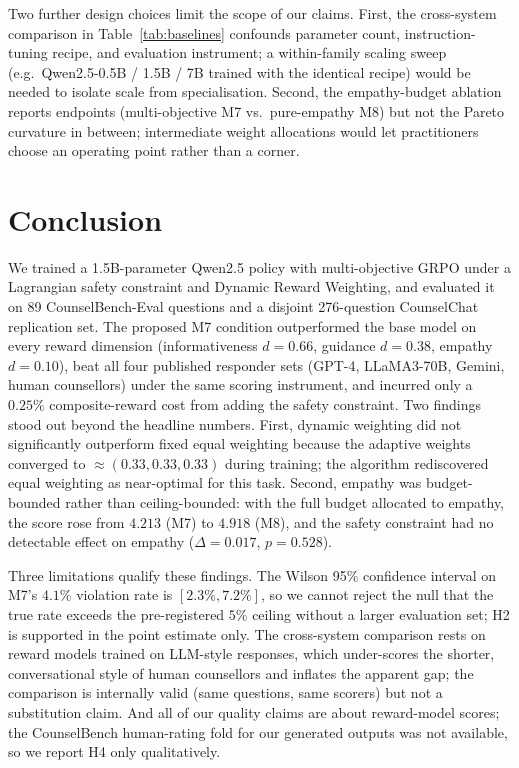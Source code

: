 \documentclass[10pt,twocolumn]{article}
\begin{document}
Two further design choices limit the scope of our claims. First, the cross-system comparison in Table~\ref{tab:baselines} confounds parameter count, instruction-tuning recipe, and evaluation instrument; a within-family scaling sweep (e.g.\ Qwen2.5-0.5B / 1.5B / 7B trained with the identical recipe) would be needed to isolate scale from specialisation. Second, the empathy-budget ablation reports endpoints (multi-objective M7 vs.\ pure-empathy M8) but not the Pareto curvature in between; intermediate weight allocations would let practitioners choose an operating point rather than a corner.

\section{Conclusion}
\label{sec:conclusion}

We trained a 1.5B-parameter Qwen2.5 policy with multi-objective GRPO under a Lagrangian safety constraint and Dynamic Reward Weighting, and evaluated it on 89 CounselBench-Eval questions and a disjoint 276-question CounselChat replication set. The proposed M7 condition outperformed the base model on every reward dimension (informativeness $d = 0.66$, guidance $d = 0.38$, empathy $d = 0.10$), beat all four published responder sets (GPT-4, LLaMA3-70B, Gemini, human counsellors) under the same scoring instrument, and incurred only a $0.25\%$ composite-reward cost from adding the safety constraint. Two findings stood out beyond the headline numbers. First, dynamic weighting did not significantly outperform fixed equal weighting because the adaptive weights converged to $\approx (0.33, 0.33, 0.33)$ during training; the algorithm rediscovered equal weighting as near-optimal for this task. Second, empathy was budget-bounded rather than ceiling-bounded: with the full budget allocated to empathy, the score rose from $4.213$ (M7) to $4.918$ (M8), and the safety constraint had no detectable effect on empathy ($\Delta = 0.017$, $p = 0.528$).

Three limitations qualify these findings. The Wilson 95\% confidence interval on M7's $4.1\%$ violation rate is $[2.3\%, 7.2\%]$, so we cannot reject the null that the true rate exceeds the pre-registered $5\%$ ceiling without a larger evaluation set; H2 is supported in the point estimate only. The cross-system comparison rests on reward models trained on LLM-style responses, which under-scores the shorter, conversational style of human counsellors and inflates the apparent gap; the comparison is internally valid (same questions, same scorers) but not a substitution claim. And all of our quality claims are about reward-model scores; the CounselBench human-rating fold for our generated outputs was not available, so we report H4 only qualitatively.
\end{document}
